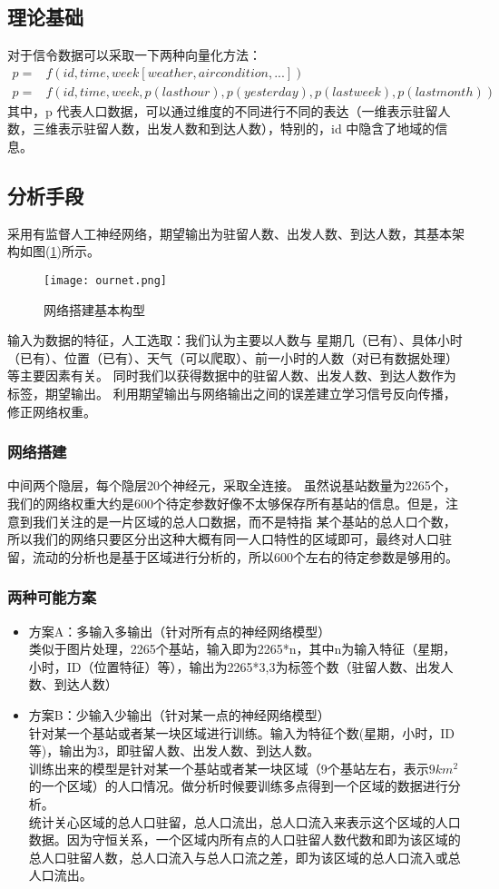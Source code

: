 \subsection{理论基础}
对于信令数据可以采取一下两种向量化方法：
\begin{equation}
\begin{split}
p = & f(id,time,week[weather,air condition,...])\\
p = & f(id,time,week,p(last hour),p(yesterday),p(last week),p(last month))
\end{split}
\end{equation}
其中，p 代表人口数据，可以通过维度的不同进行不同的表达（一维表示驻留人数，三维表示驻留人数，出发人数和到达人数），特别的，id 中隐含了地域的信息。
\subsection{分析手段}
采用有监督人工神经网络，期望输出为驻留人数、出发人数、到达人数，其基本架构如图(\ref{fig:3.1})所示。
\begin{figure}[ht]
\centering
\texttt{[image: ournet.png]}
\caption{网络搭建基本构型}
\label{fig:3.1}
\end{figure}
输入为数据的特征，人工选取：我们认为主要以人数与 星期几（已有）、具体小时（已有）、位置（已有）、天气（可以爬取）、前一小时的人数（对已有数据处理）等主要因素有关。
同时我们以获得数据中的驻留人数、出发人数、到达人数作为标签，期望输出。
利用期望输出与网络输出之间的误差建立学习信号反向传播，修正网络权重。
\subsubsection*{网络搭建}
中间两个隐层，每个隐层20个神经元，采取全连接。
虽然说基站数量为2265个，我们的网络权重大约是600个待定参数好像不太够保存所有基站的信息。但是，注意到我们关注的是一片区域的总人口数据，而不是特指
某个基站的总人口个数，所以我们的网络只要区分出这种大概有同一人口特性的区域即可，最终对人口驻留，流动的分析也是基于区域进行分析的，所以600个左右的待定参数是够用的。
\subsubsection*{两种可能方案}
\begin{itemize}
	\item 方案A：多输入多输出（针对所有点的神经网络模型）\\
	类似于图片处理，2265个基站，输入即为2265*n，其中n为输入特征（星期，小时，ID（位置特征）等），输出为2265*3,3为标签个数（驻留人数、出发人数、到达人数）
	\item 方案B：少输入少输出（针对某一点的神经网络模型）\\
	针对某一个基站或者某一块区域进行训练。输入为特征个数(星期，小时，ID等)，输出为3，即驻留人数、出发人数、到达人数。\\
	训练出来的模型是针对某一个基站或者某一块区域（9个基站左右，表示$9km^2$的一个区域）的人口情况。做分析时候要训练多点得到一个区域的数据进行分析。\\
	统计关心区域的总人口驻留，总人口流出，总人口流入来表示这个区域的人口数据。因为守恒关系，一个区域内所有点的人口驻留人数代数和即为该区域的总人口驻留人数，总人口流入与总人口流之差，即为该区域的总人口流入或总人口流出。
\end{itemize}
